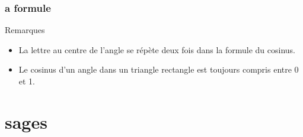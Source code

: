 \documentclass{beamer}
\begin{document}
\begin{frame}
  \frametitle{{}a formule}
  
  \begin{block}{Remarques}
    \begin{itemize}
    \item La lettre au centre de l'angle se répète deux fois dans la formule du cosinus.
    \item Le cosinus d'un angle dans un triangle rectangle est toujours compris entre 0 et 1.
    \end{itemize}
  \end{block}
  
\end{frame}


\section{{}sages}
\end{document}
